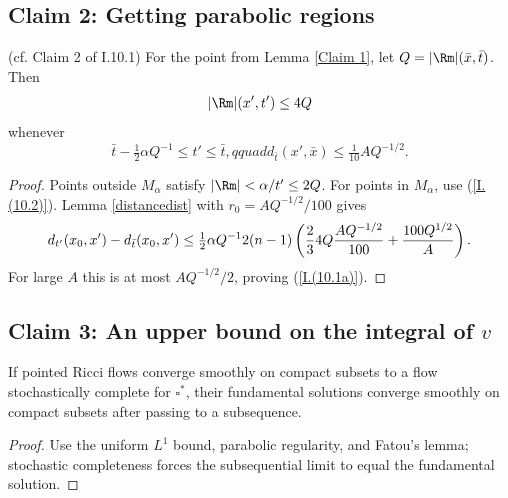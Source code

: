 \subsection{Claim 2: Getting parabolic regions}
\begin{lemma}
  \label{lem:kl-getting-parabolic-regions-getting-parabolic-regions-lemma}
  (cf. Claim 2 of I.10.1) \label{Claim 2}
For the point from Lemma \ref{Claim 1}, let $Q=|\Rm|(\bar x,\bar t)$. Then
\begin{equation}\label{I.(10.1a)}|\Rm|(x',t')\le4Q\end{equation}
whenever
\begin{equation}\label{I.(10.3)}\bar t-\tfrac12\alpha Q^{-1}\le t'\le\bar t,qquad
d_{\bar t}(x',\bar x)\le\tfrac1{10}AQ^{-1/2}.
\end{equation}
\end{lemma}
\begin{proof}
\sketch
Points outside $M_\alpha$ satisfy $|\Rm|<\alpha/t'\le2Q$. For points in $M_\alpha$,
use (\ref{I.(10.2)}). Lemma \ref{distancedist} with
$r_0=AQ^{-1/2}/100$ gives
\begin{equation}\label{32.4}
d_{t'}(x_0,x')-d_{\bar t}(x_0,x')\le\tfrac12\alpha Q^{-1}2(n-1)\left({2\over3}4Q{AQ^{-1/2}\over100}+{100Q^{1/2}\over A}\right).
\end{equation}
For large $A$ this is at most $AQ^{-1/2}/2$, proving (\ref{I.(10.1a)}).
\end{proof}

\subsection{Claim 3: An upper bound on the integral of $v$}
 \label{Claim3}
\begin{lemma}
  \label{lem:kl-upper-bound-integral-integral-bound-pseudolocality}
  \label{stoccomplete}
If pointed Ricci flows converge smoothly on compact subsets to a flow stochastically
complete for $\square^*$, their fundamental solutions converge smoothly on compact
subsets after passing to a subsequence.
\end{lemma}
\begin{proof}
\sketch
Use the uniform $L^1$ bound, parabolic regularity, and Fatou's lemma; stochastic
completeness forces the subsequential limit to equal the fundamental solution.
\end{proof}


